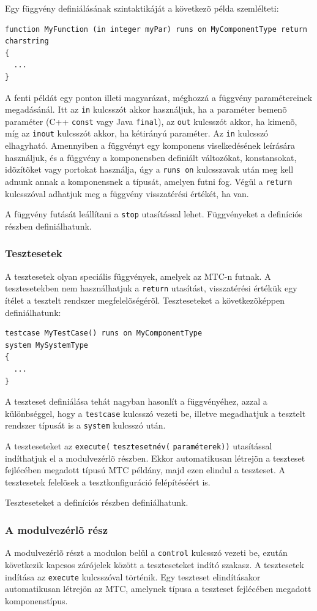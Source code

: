 \documentclass[a4paper]{article}
\begin{document}
Egy függvény definiálásának szintaktikáját a következõ példa
szemlélteti:
{\footnotesize
\begin{lstlisting}
function MyFunction (in integer myPar) runs on MyComponentType return charstring
{
  ...
}
\end{lstlisting}
}
A fenti példát egy ponton illeti magyarázat, méghozzá a függvény paramétereinek
megadásánál. Itt az \verb/in/ kulcsszót akkor használjuk, ha a
paraméter bemenõ paraméter (C++ \verb/const/ vagy Java \verb/final/), az \verb/out/
kulcsszót akkor, ha kimenõ, míg az \verb/inout/ kulcsszót akkor, ha
kétirányú paraméter. Az \verb/in/ kulcsszó elhagyható. 
Amennyiben a függvényt egy komponens viselkedésének leírására használjuk, és a függvény a
komponensben definiált változókat, konstansokat, idõzítõket vagy portokat használja, úgy a
\verb/runs on/ kulcsszavak után meg kell adnunk annak a komponensnek a
típusát, amelyen futni fog. Végül a \verb/return/ kulcsszóval adhatjuk meg a
függvény visszatérési értékét, ha van.


A függvény futását
leállítani a \verb/stop/ utasítással lehet.
Függvényeket a definíciós részben definiálhatunk.

\subsubsection{Tesztesetek}
A tesztesetek olyan speciális függvények, amelyek az MTC-n futnak. A teszt\-e\-se\-tek\-ben nem
használhatjuk a \verb/return/ utasítást, visszatérési értékük egy ítélet a tesztelt rendszer
megfelelõségérõl. Teszteseteket a következõképpen definiálhatunk:
{\footnotesize
\begin{lstlisting}
testcase MyTestCase() runs on MyComponentType
system MySystemType
{
  ...
}
\end{lstlisting}
}
A teszteset definiálása tehát nagyban hasonlít a függvényéhez, azzal a különbséggel, hogy a
\verb.testcase. kulcsszó vezeti be, illetve megadhatjuk a tesztelt rendszer típusát is a \verb.system.
kulcsszó után.

A teszteseteket az
\verb/execute(/ \verb/tesztesetnév(/ \verb/paraméterek))/ utasítással indíthatjuk el a modulvezérlõ részben. Ekkor automatikusan létrejön a
teszt\-e\-set fejlécében megadott típusú MTC példány, majd ezen elindul a teszteset. A
tesztesetek felelõsek a tesztkonfiguráció felépítéséért is.


Teszteseteket a definíciós részben definiálhatunk.

\subsubsection{A modulvezérlõ rész}
A modulvezérlõ részt a modulon belül a \verb/control/ kulcsszó vezeti be, ezután következik
kapcsos zárójelek között a teszteseteket indító szakasz. A teszt\-e\-se\-tek indítása az \verb/execute/
kulcsszóval történik. Egy teszteset elindításakor automatikusan létrejön az MTC, amelynek
típusa a teszteset fejlécében megadott komponenstípus.
\end{document}
